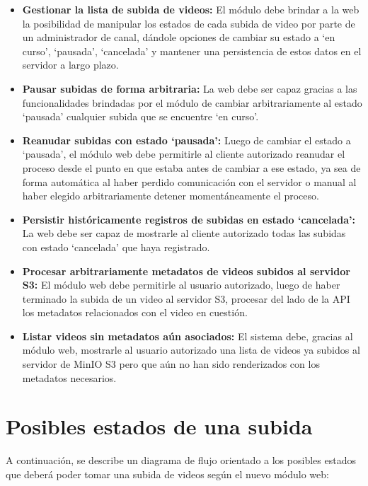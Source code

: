 \begin{itemize}
  \item \textbf{Gestionar la lista de subida de videos:} El módulo debe brindar a la web la
  posibilidad de manipular los estados de cada subida de video por parte de un administrador de canal,
  dándole opciones de cambiar su estado a `en curso', `pausada', `cancelada' y mantener una
  persistencia de estos datos en el servidor a largo plazo.

  \item \textbf{Pausar subidas de forma arbitraria:} La web debe ser capaz gracias a las
  funcionalidades brindadas por el módulo de cambiar arbitrariamente al estado `pausada' cualquier
  subida que se encuentre `en curso'.

  \item \textbf{Reanudar subidas con estado `pausada':} Luego de cambiar el estado a `pausada', el
  módulo web debe permitirle al cliente autorizado reanudar el proceso desde el punto en que estaba
  antes de cambiar a ese estado, ya sea de forma automática al haber perdido comunicación con el
  servidor o manual al haber elegido arbitrariamente detener momentáneamente el proceso.

  \item \textbf{Persistir históricamente registros de subidas en estado `cancelada':} La web debe ser
  capaz de mostrarle al cliente autorizado todas las subidas con estado `cancelada' que haya
  registrado.

  \item \textbf{Procesar arbitrariamente metadatos de videos subidos al servidor S3:} El módulo web
  debe permitirle al usuario autorizado, luego de haber terminado la subida de un video al servidor
  S3, procesar del lado de la API los metadatos relacionados con el video en cuestión.

  \item \textbf{Listar videos sin metadatos aún asociados:} El sistema debe, gracias al módulo web,
  mostrarle al usuario autorizado una lista de videos ya subidos al servidor de MinIO S3 pero que aún
  no han sido renderizados con los metadatos necesarios.
\end{itemize}

\section{Posibles estados de una subida}

A continuación, se describe un diagrama de flujo orientado a los posibles estados que deberá poder
tomar una subida de videos según el nuevo módulo web:

